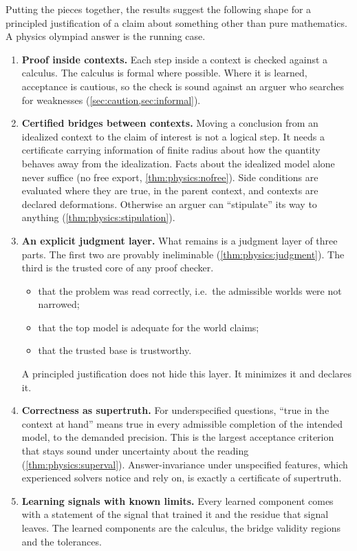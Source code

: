Putting the pieces together, the results suggest the following shape for a principled justification of a claim about something other than pure mathematics. A physics olympiad answer is the running case.

\begin{enumerate}
\item \textbf{Proof inside contexts.} Each step inside a context is checked against a calculus. The calculus is formal where possible. Where it is learned, acceptance is cautious, so the check is sound against an arguer who searches for weaknesses (\cref{sec:caution,sec:informal}).
\item \textbf{Certified bridges between contexts.} Moving a conclusion from an idealized context to the claim of interest is not a logical step. It needs a certificate carrying information of finite radius about how the quantity behaves away from the idealization. Facts about the idealized model alone never suffice (no free export, \cref{thm:physics:nofree}). Side conditions are evaluated where they are true, in the parent context, and contexts are declared deformations. Otherwise an arguer can ``stipulate'' its way to anything (\cref{thm:physics:stipulation}).
\item \textbf{An explicit judgment layer.} What remains is a judgment layer of three parts. The first two are provably ineliminable (\cref{thm:physics:judgment}). The third is the trusted core of any proof checker.
  \begin{itemize}
  \item that the problem was read correctly, i.e.\ the admissible worlds were not narrowed;
  \item that the top model is adequate for the world claims;
  \item that the trusted base is trustworthy.
  \end{itemize}
  A principled justification does not hide this layer. It minimizes it and declares it.
\item \textbf{Correctness as supertruth.} For underspecified questions, ``true in the context at hand'' means true in every admissible completion of the intended model, to the demanded precision. This is the largest acceptance criterion that stays sound under uncertainty about the reading (\cref{thm:physics:superval}). Answer-invariance under unspecified features, which experienced solvers notice and rely on, is exactly a certificate of supertruth.
\item \textbf{Learning signals with known limits.} Every learned component comes with a statement of the signal that trained it and the residue that signal leaves. The learned components are the calculus, the bridge validity regions and the tolerances.
\end{enumerate}

